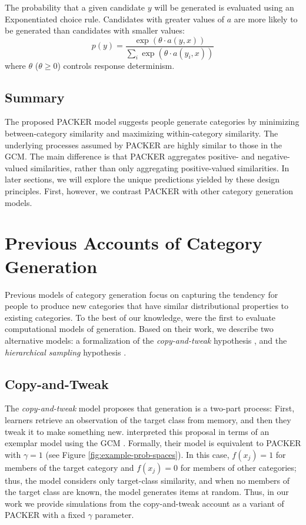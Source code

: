 \documentclass[10pt,letterpaper]{article}
\begin{document}
The probability that a given candidate $y$ will be generated is evaluated using an Exponentiated \citet{luce1977choice} choice rule. Candidates with greater values of $a$ are more likely to be generated than candidates with smaller values:
\begin{equation}
p(y) = \dfrac
    { \exp( { \theta \cdot a(y, x) } ) }
    { \sum_i{ \exp( { \theta \cdot a(y_i, x) } ) } }
    \label{eq:packer-choice}
\end{equation}
where $\theta$ ($\theta \geq 0$) controls response determinism. 

\subsection{Summary}
The proposed PACKER model suggests people generate categories by minimizing between-category similarity and maximizing within-category similarity. The underlying processes assumed by PACKER are highly similar to those in the GCM. The main difference is that PACKER aggregates positive- and negative-valued similarities, rather than only aggregating positive-valued similarities. In later sections, we will explore the unique predictions yielded by these design principles. First, however, we contrast PACKER with other category generation models. 

\section{Previous Accounts of Category Generation}

Previous models of category generation focus on capturing the tendency for people to produce new categories that have similar distributional properties to existing categories. To the best of our knowledge, \citet{jern2013probabilistic} were the first to evaluate computational models of generation. Based on their work, we describe two alternative models: a formalization of the \textit{copy-and-tweak} hypothesis \citep{ward1995s}, and the \textit{hierarchical sampling} hypothesis \citep{jern2013probabilistic}.


\subsection{Copy-and-Tweak}
The \textit{copy-and-tweak} model proposes that generation is a two-part process: First, learners retrieve an observation of the target class from memory, and then they tweak it to make something new. \citet{jern2013probabilistic} interpreted this proposal in terms of an exemplar model using the GCM \citep{nosofsky1984choice}. Formally, their model is equivalent to PACKER with $\gamma = 1$ (see Figure \ref{fig:example-prob-spaces}). In this case,  $f(x_j) = 1$ for members of the target category and $f(x_j) = 0$ for members of other categories; thus, the model considers only target-class similarity, and when no members of the target class are known, the model generates items at random. Thus, in our work we provide simulations from the copy-and-tweak account as a variant of PACKER with a fixed $\gamma$ parameter.
\end{document}
